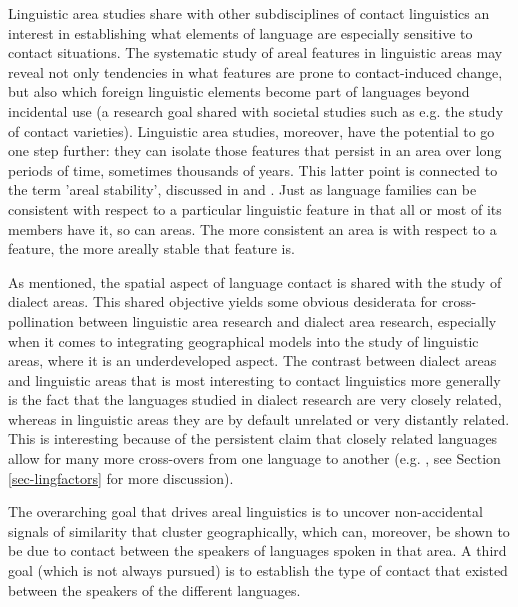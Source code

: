 \documentclass[output=paper,
modfonts
]{langscibook}
\begin{document}
Linguistic area studies share with other subdisciplines of contact linguistics an interest in establishing what elements of language are especially sensitive to contact situations. The systematic study of areal features in linguistic areas may reveal not only tendencies in what features are prone to contact-induced change, but also which foreign linguistic elements become part of languages beyond incidental use (a research goal shared with societal studies such as e.g. the study of contact varieties). Linguistic area studies, moreover, have the potential to go one step further: they can isolate those features that persist in an area over long periods of time, sometimes thousands of years.  This latter point is connected to the term 'areal stability', discussed in \textcite{Nichols1992Linguistic} and \textcite{Nichols2003Diversity}. Just as language families can be consistent with respect to a particular linguistic feature in that all or most of its members have it, so can areas. The more consistent an area is with respect to a feature, the more areally stable that feature is. 

As mentioned, the spatial aspect of language contact is shared with the study of dialect areas. This shared objective yields some obvious desiderata for cross-pollination between linguistic area research and dialect area research, especially when it comes to integrating geographical models into the study of linguistic areas, where it is an underdeveloped aspect. The contrast between dialect areas and linguistic areas that is most interesting to contact linguistics more generally is the fact that the languages studied in dialect research are very closely related, whereas in linguistic areas they are by default unrelated or very distantly related. This is interesting because of the persistent claim that closely related languages allow for many more cross-overs from one language to another (e.g. \citep{Weinreich1953Languages,moravcsik1975verb,winford2005contact}, see Section \ref{sec-lingfactors} for more discussion).

The overarching goal that drives areal linguistics is to uncover non-accidental signals of similarity that cluster geographically, which can, moreover, be shown to be due to contact between the speakers of languages spoken in that area. A third goal (which is not always pursued) is to establish the type of contact that existed between the speakers of the different languages.
% 
% 
\end{document}
